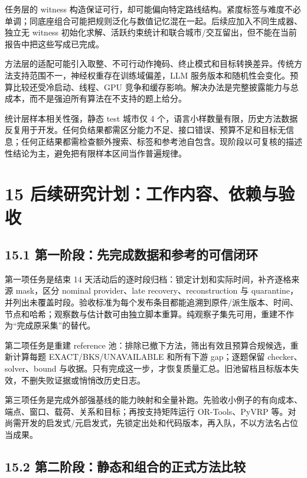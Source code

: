\documentclass[UTF8,10pt,a4paper,fontset=fandol]{ctexart}
\begin{document}
任务层的 witness 构造保证可行，却可能偏向特定路线结构。紧度标签与难度不必单调；同底座组合可能把规则泛化与数值记忆混在一起。后续应加入不同生成器、独立无 witness 初始化求解、活跃约束统计和联合城市/\allowbreak{}交互留出，但不能在当前报告中把这些写成已完成。


方法层的适配可能引入取整、不可行动作掩码、终止模式和目标转换差异。传统方法支持范围不一，神经权重存在训练域偏差，LLM 服务版本和随机性会变化。预算比较还受冷启动、线程、GPU 竞争和缓存影响。解决办法是完整披露能力与总成本，而不是强迫所有算法在不支持的题上给分。


统计层样本相关性强，静态 test 城市仅 4 个，语言小样数量有限，历史方法数据反复用于开发。任何负结果都需区分能力不足、接口错误、预算不足和目标无信息；任何正结果都需检查额外搜索、标签和参考池自包含。现阶段以可复核的描述性结论为主，避免把有限样本区间当作普遍规律。


\section*{15 后续研究计划：工作内容、依赖与验收}


\subsection*{15.1 第一阶段：先完成数据和参考的可信闭环}


第一项任务是结束 14 天活动后的逐时段归档：锁定计划和实际时间，补齐逐格来源 mask，区分 nominal provider、late recovery、reconstruction 与 quarantine，并列出未覆盖时段。验收标准为每个发布条目都能追溯到原件/\allowbreak{}派生版本、时间、节点和哈希；观察数与估计数可由独立脚本重算。纯观察子集先可用，重建不作为“完成原采集”的替代。


第二项任务是重建 reference 池：排除已撤下方法，筛出有效且预算合规候选，重新计算每题 EXACT/\allowbreak{}BKS/\allowbreak{}UNAVAILABLE 和所有下游 gap；逐题保留 checker、solver、bound 与收据。只有完成这一步，才恢复质量汇总。旧池留档且标版本失效，不删失败证据或悄悄改历史日志。


第三项任务是完成外部强基线的能力映射和全量补跑。先验收小例子的有向成本、端点、窗口、载荷、关系和目标；再按支持矩阵运行 OR-Tools、PyVRP 等。对尚需开发的启发式/\allowbreak{}元启发式，先锁定出处和代码版本，再入队，不以方法名占位当成果。


\subsection*{15.2 第二阶段：静态和组合的正式方法比较}
\end{document}
